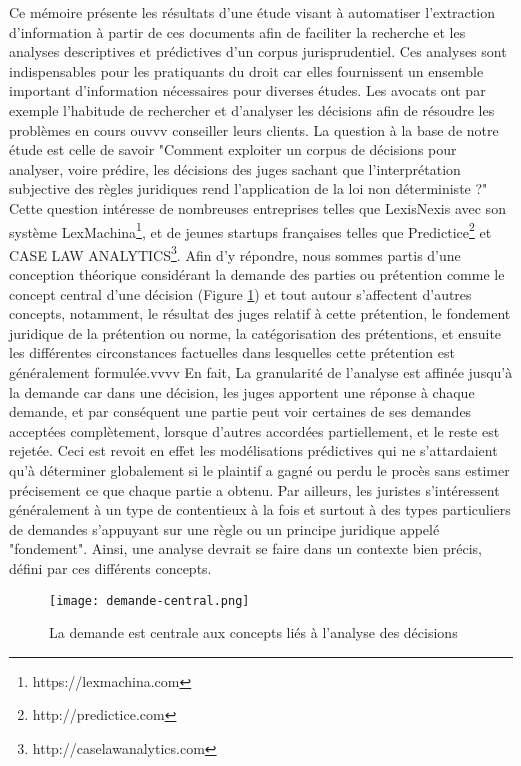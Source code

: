 Ce mémoire présente les résultats d'une étude visant à automatiser l'extraction d'information à partir de ces documents afin de faciliter la recherche et les analyses descriptives et prédictives d'un corpus jurisprudentiel. Ces analyses sont indispensables pour les pratiquants du droit car elles fournissent un ensemble important d'information  nécessaires pour diverses études.  Les avocats ont par exemple l'habitude de rechercher et d'analyser les décisions afin de résoudre les problèmes en cours ouvvv conseiller leurs clients.  La question à la base de notre étude est celle de savoir "Comment exploiter un corpus de décisions pour analyser, voire prédire, les décisions des juges sachant que l'interprétation subjective des règles juridiques rend l'application de la loi non déterministe ?" Cette question intéresse de nombreuses entreprises telles que LexisNexis avec son système LexMachina\footnote{https://lexmachina.com}, et de jeunes startups françaises telles que Predictice\footnote{http://predictice.com} et CASE LAW ANALYTICS\footnote{http://caselawanalytics.com}. Afin d'y répondre, nous sommes partis d'une conception théorique considérant la demande des parties ou prétention comme le concept central d'une décision (Figure \ref{fig:intro:demande-central}) et tout autour s'affectent d'autres concepts, notamment, le résultat des juges relatif à cette prétention, le fondement juridique de la prétention ou norme, la catégorisation des prétentions, et ensuite les différentes circonstances factuelles dans lesquelles cette prétention est généralement formulée.vvvv En fait, La granularité de l'analyse est affinée jusqu'à la demande car dans une décision, les juges apportent une réponse à chaque demande, et par conséquent une partie peut voir certaines de ses demandes acceptées complètement, lorsque d'autres accordées partiellement, et le reste est rejetée. Ceci est revoit en effet les modélisations prédictives qui ne s'attardaient qu'à déterminer globalement si le plaintif a  gagné ou perdu le procès sans estimer précisement ce que chaque partie a obtenu. Par ailleurs, les juristes s'intéressent généralement à un type de contentieux à la fois et surtout à des types particuliers de demandes s'appuyant sur une règle ou un principe juridique appelé "fondement". Ainsi, une analyse devrait se faire dans un contexte bien précis, défini par ces différents concepts.

\begin{figure}[h!]
    \centering
    \texttt{[image: demande-central.png]}
    \caption{La demande est centrale aux concepts liés à l'analyse des décisions}
    \label{fig:intro:demande-central}
\end{figure}




